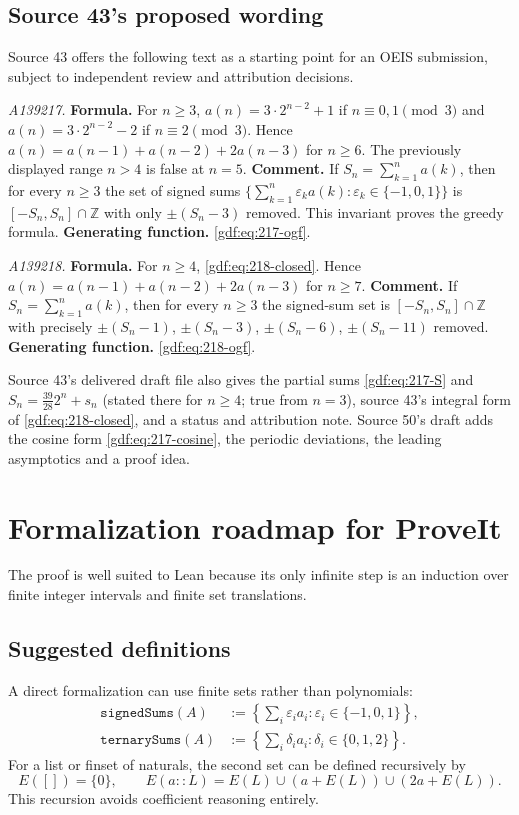 \documentclass[11pt,a4paper]{article}
\numberwithin{equation}{section}
\theoremstyle{definition}
\theoremstyle{remark}
\theoremstyle{plain}
\newcommand{\Z}{\mathbb Z}
\begin{document}
\subsection{Source 43's proposed wording}

Source 43 offers the following text as a starting point for an OEIS
submission, subject to independent review and attribution decisions.

\emph{A139217.} \textbf{Formula.} For $n\ge3$,
$a(n)=3\cdot2^{n-2}+1$ if $n\equiv0,1\pmod3$ and $a(n)=3\cdot2^{n-2}-2$ if
$n\equiv2\pmod3$.  Hence $a(n)=a(n-1)+a(n-2)+2a(n-3)$ for $n\ge6$.  The
previously displayed range $n>4$ is false at $n=5$.
\textbf{Comment.} If $S_n=\sum_{k=1}^n a(k)$, then for every $n\ge3$ the set
of signed sums
$\{\sum_{k=1}^n\varepsilon_k a(k):\varepsilon_k\in\{-1,0,1\}\}$ is
$[-S_n,S_n]\cap\Z$ with only $\pm(S_n-3)$ removed.  This invariant proves the
greedy formula.
\textbf{Generating function.} \eqref{gdf:eq:217-ogf}.

\emph{A139218.} \textbf{Formula.} For $n\ge4$, \eqref{gdf:eq:218-closed}.
Hence $a(n)=a(n-1)+a(n-2)+2a(n-3)$ for $n\ge7$.
\textbf{Comment.} If $S_n=\sum_{k=1}^n a(k)$, then for every $n\ge3$ the
signed-sum set is $[-S_n,S_n]\cap\Z$ with precisely
$\pm(S_n-1)$, $\pm(S_n-3)$, $\pm(S_n-6)$, $\pm(S_n-11)$ removed.
\textbf{Generating function.} \eqref{gdf:eq:218-ogf}.

Source 43's delivered draft file also gives the partial sums
\eqref{gdf:eq:217-S} and $S_n=\frac{39}{28}2^n+s_n$ (stated there for
$n\ge4$; true from $n=3$), source 43's integral form of
\eqref{gdf:eq:218-closed}, and a status and attribution note.  Source 50's
draft adds the cosine form \eqref{gdf:eq:217-cosine}, the periodic deviations,
the leading asymptotics and a proof idea.

\section{Formalization roadmap for ProveIt}\label{gdf:sec:roadmap}

The proof is well suited to Lean because its only infinite step is an
induction over finite integer intervals and finite set translations.

\subsection{Suggested definitions}

A direct formalization can use finite sets rather than polynomials:
\begin{align*}
 \texttt{signedSums}(A)&:=
 \left\{\sum_i\varepsilon_i a_i:\varepsilon_i\in\{-1,0,1\}\right\},\\
 \texttt{ternarySums}(A)&:=
 \left\{\sum_i\delta_i a_i:\delta_i\in\{0,1,2\}\right\}.
\end{align*}
For a list or finset of naturals, the second set can be defined recursively by
\[
 E([])=\{0\},\qquad E(a::L)=E(L)\cup(a+E(L))\cup(2a+E(L)).
\]
This recursion avoids coefficient reasoning entirely.
\end{document}
